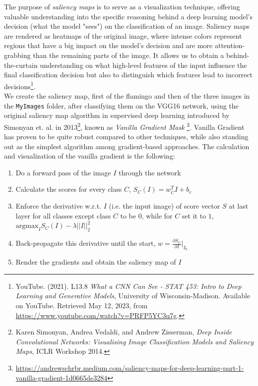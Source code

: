 \documentclass{article}
\def\code#1{\texttt{#1}}
\begin{document}
    The purpose of \textit{saliency maps} is to serve as a visualization technique, offering valuable understanding into the specific reasoning behind a deep learning model's decision (what the model "sees") on the classification of an image. Saliency maps are rendered as heatmaps of the original image, where intense colors represent regions that have a big impact on the model's decision and are more attention-grabbing than the remaining parts of the image. It allows us to obtain a behind-the-curtain understanding on what high-level features of the input influence the final classification decision but also to distinguish which features lead to incorrect decisions\footnote{YouTube. (2021). L13.8 \textit{What a CNN Can See - STAT 453: Intro to Deep Learning and Generative Models}, University of Wisconsin-Madison. Available on YouTube. Retrieved May 12, 2023, from \url{https://www.youtube.com/watch?v=PRFP5YC3u7g}.}. \\
    
    We create the saliency map, first of the flamingo and then of the three images in the \code{MyImages} folder, after classifying them on the VGG16 network, using the original saliency map algorithm in supervised deep learning introduced by Simonyan et. al. in 2013\footnote{Karen Simonyan, Andrea Vedaldi, and Andrew Zisserman, \textit{Deep Inside Convolutional Networks: Visualising Image Classification Models and Saliency Maps}, ICLR Workshop 2014.}, known as \textit{Vanilla Gradient Mask} \footnote{\url{https://andrewschrbr.medium.com/saliency-maps-for-deep-learning-part-1-vanilla-gradient-1d0665de3284}}. Vanilla Gradient has proven to be quite robust compared to other techniques, while also standing out as the simplest algorithm among gradient-based approaches. The calculation and visualization of the vanilla gradient is the following:
    
    \begin{enumerate}
    	\item Do a forward pass of the image $I$ through the network
    	\item Calculate the scores for every class $C$, $S_C (I) = w^T_C I + b_c$
    	\item Enforce the derivative w.r.t. $I$ (i.e. the input image) of score vector $S$ at last layer for all classes except class $C$ to be $0$, while for $C$ set it to $1$, $\displaystyle \text{argmax}_I S_C(I) - \lambda ||I||^2_2$
    	\item Back-propagate this derivative until the start, $w = \frac{\partial S_C}{\partial I} |_{I_0}$
    	\item Render the gradients and obtain the saliency map of $I$
    \end{enumerate}
\end{document}
